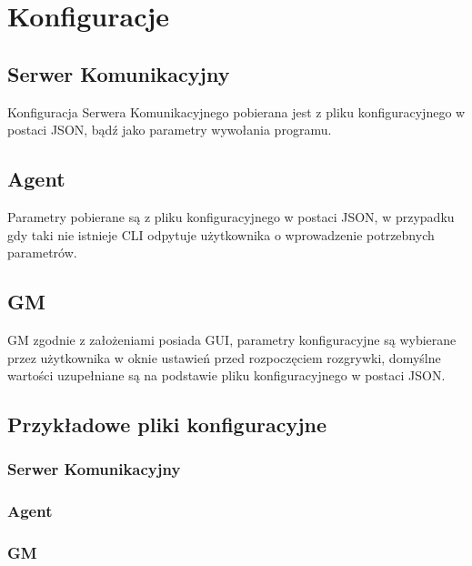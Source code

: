 \documentclass[./../Dokumentacja.tex]{subfiles}
\begin{document}
\section{Konfiguracje}
\label{sec:Konfiguracje}
\subsection{Serwer Komunikacyjny}
Konfiguracja Serwera Komunikacyjnego pobierana jest z pliku konfiguracyjnego w postaci JSON,
bądź jako parametry wywołania programu.

\subsection{Agent}
Parametry pobierane są z pliku konfiguracyjnego w postaci JSON, w przypadku gdy taki nie istnieje
CLI odpytuje użytkownika o wprowadzenie potrzebnych parametrów.

\subsection{GM}
GM zgodnie z założeniami posiada GUI, parametry konfiguracyjne są wybierane przez użytkownika w
oknie ustawień przed rozpoczęciem rozgrywki, domyślne wartości uzupełniane są na podstawie pliku
konfiguracyjnego w postaci JSON.

\subsection{Przykładowe pliki konfiguracyjne}
\subsubsection{Serwer Komunikacyjny}

\subsubsection{Agent}

\subsubsection{GM}

\end{document}
